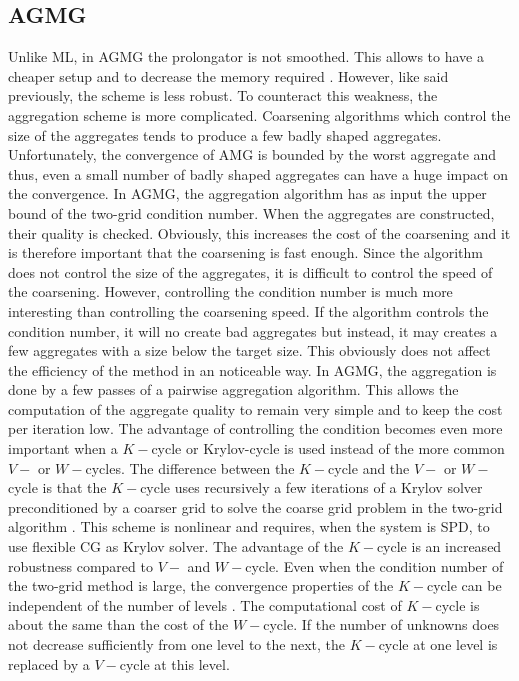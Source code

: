 \subsection{AGMG}
Unlike ML, in AGMG the prolongator is not smoothed. This allows to have a
cheaper setup and to decrease the memory required \cite{agmg2}. However, like
said previously, the scheme is less robust. To counteract this weakness, the
aggregation scheme is more complicated. Coarsening algorithms which control
the size of the aggregates tends to produce a few badly shaped aggregates.
Unfortunately, the convergence of AMG is bounded by the worst aggregate and
thus, even a small number of badly shaped aggregates can have a huge impact on
the convergence. In AGMG, the aggregation algorithm has as input the upper
bound of the two-grid condition number. When the aggregates are constructed,
their quality is checked. Obviously, this increases the cost of the coarsening
and it is therefore important that the coarsening is fast enough. Since the 
algorithm does not control the size of the aggregates, it is difficult to 
control the speed of the coarsening. However, controlling the condition number
is much more interesting than controlling the coarsening speed. If the algorithm 
controls the condition number, it will no create bad aggregates but instead, it 
may creates a few aggregates with a size below the target size. This obviously 
does not affect the efficiency of the method in an noticeable way\cite{agmg2}. 
In AGMG, the aggregation is done by a few passes of a pairwise aggregation 
algorithm. This allows the computation of the aggregate quality to remain very 
simple and to keep the cost per iteration low. The advantage of controlling the 
condition becomes even more important when a $K-$cycle or Krylov-cycle is used 
instead of the more common $V-$ or $W-$cycles. The difference between the 
$K-$cycle and the $V-$ or $W-$cycle is that the $K-$cycle uses recursively a 
few iterations of a Krylov solver preconditioned by a coarser grid to solve 
the coarse grid problem in the two-grid algorithm \cite{k_cycle}. This scheme 
is nonlinear and requires, when the system is SPD, to use flexible CG 
\cite{fcg,fcg2,fcg3,fcg4} as Krylov solver. The advantage of the $K-$cycle is 
an increased robustness compared to $V-$ and $W-$cycle. Even when the condition 
number of the two-grid method is large, the convergence properties of the 
$K-$cycle can be independent of the number of levels \cite{k_cycle}. The 
computational cost of $K-$cycle is about the same than the cost of the 
$W-$cycle. If the number of unknowns does not decrease sufficiently from one 
level to the next, the $K-$cycle at one level is replaced by a $V-$cycle at 
this level.
